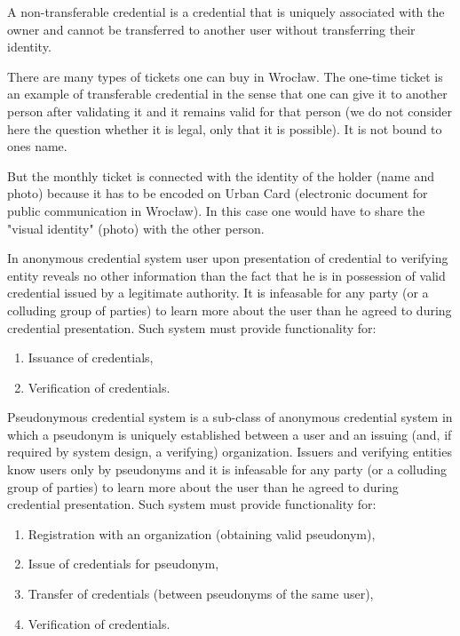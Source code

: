\begin{definition}
A non-transferable credential is a credential that is uniquely associated with the owner and cannot be transferred to another user without transferring their identity.
\end{definition}

\begin{example}
There are many types of tickets one can buy in Wrocław. The one-time ticket is an example of transferable credential in the sense that one can give it to another person after validating it and it remains valid for that person (we do not consider here the question whether it is legal, only that it is possible). It is not bound to ones name.

But the monthly ticket is connected with the identity of the holder (name and photo) because it has to be encoded on Urban Card (electronic document for public communication in Wrocław). In this case one would have to share the "visual identity" (photo) with the other person.
\end{example}

\begin{definition}
In anonymous credential system user upon presentation of credential to verifying entity reveals no other information than the fact that he is in possession of valid credential issued by a legitimate authority. It is infeasable for any party (or a colluding group of parties) to learn more about the user than he agreed to during credential presentation. Such system must provide functionality for:
\begin{enumerate}
    \item Issuance of credentials,
    \item Verification of credentials.
\end{enumerate}
\end{definition}

\begin{definition}
Pseudonymous credential system is a sub-class of anonymous credential system in which a pseudonym is uniquely established between a user and an issuing (and, if required by system design, a verifying) organization. Issuers and verifying entities know users only by pseudonyms and it is infeasable for any party (or a colluding group of parties) to learn more about the user than he agreed to during credential presentation. Such system must provide functionality for:
\begin{enumerate}
    \item Registration with an organization (obtaining valid pseudonym),
    \item Issue of credentials for pseudonym,
    \item Transfer of credentials (between pseudonyms of the same user),
    \item Verification of credentials.
\end{enumerate}
\end{definition}

